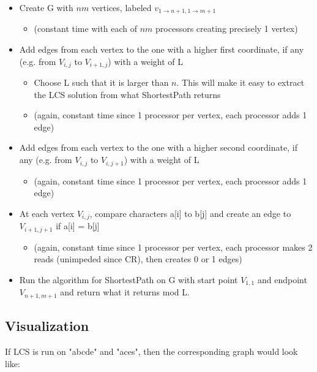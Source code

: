 \documentclass[a4paper]{article}
\begin{document}
\begin{itemize}
    \item Create G with $nm$ vertices, labeled $v_{1 \rightarrow n+1,1 \rightarrow m+1}$
    \begin{itemize}
        \item (constant time with each of $nm$ processors creating precisely 1 vertex)
    \end{itemize}
    \item Add edges from each vertex to the one with a higher first coordinate, if any (e.g. from $V_{i,j}$ to $V_{i+1,j}$) with a weight of L
    \begin{itemize}
        \item Choose L such that it is larger than $n$. This will make it easy to extract the LCS solution from what ShortestPath returns
        \item (again, constant time since 1 processor per vertex, each processor adds 1 edge)
    \end{itemize}
    \item Add edges from each vertex to the one with a higher second coordinate, if any (e.g. from $V_{i,j}$ to $V_{i,j+1}$) with a weight of L
    \begin{itemize}
        \item (again, constant time since 1 processor per vertex, each processor adds 1 edge)
    \end{itemize}
    \item At each vertex $V_{i,j}$, compare characters a[i] to b[j] and create an edge to $V_{i+1,j+1}$ if a[i] = b[j]
    \begin{itemize}
        \item (again, constant time since 1 processor per vertex, each processor makes 2 reads (unimpeded since CR), then creates 0 or 1 edges)
    \end{itemize}
    \item Run the algorithm for ShortestPath on G with start point $V_{1,1}$ and endpoint $V_{n+1,m+1}$ and return what it returns mod L.
\end{itemize}

\subsection{Visualization}
If LCS is run on "abcde" and "aces", then the corresponding graph would look like:
\end{document}
